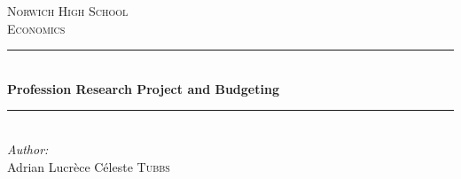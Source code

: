 \begin{titlepage}

\newcommand{\HRule}{\rule{\linewidth}{0.5mm}} %

\center{} %
 

\textsc{\LARGE Norwich High School}\\[1.5cm] %
\textsc{\Large Economics}\\[0.5cm] %


\HRule{} \\[0.4cm]
{ \huge \bfseries Profession Research Project and Budgeting}\\[0.4cm] %
\HRule{} \\[1.5cm]
 



\Large \emph{Author:}\\
Adrian Lucrèce Céleste \textsc{Tubbs}\\[3cm] %


\end{titlepage}
